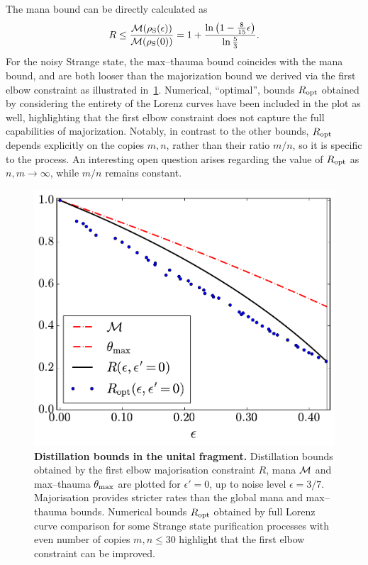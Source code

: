 \documentclass[pra,
aps,
twocolumn,
superscriptaddress,
groupedaddress,
nofootinbib,
reprint
]{revtex4-1}
\begin{document}
The mana bound can be directly calculated as
\begin{equation}
	R \leq \frac{{{\mathcal M}(\rho_{\rm{S}}(\epsilon))}}{{{\mathcal M}(\rho_{\rm{S}}(0))}} = 1 + \frac{\ln \left(1 - \frac{8}{15}\epsilon \right)}{\ln \frac{5}{3}}.
\end{equation}
For the noisy Strange state, the max--thauma bound coincides with the mana bound, and are both looser than the majorization bound we derived via the first elbow constraint as illustrated in~\cref{fig:distill_bounds}. 
Numerical, ``optimal'', bounds $R_{\rm{opt}}$ obtained by considering the entirety of the Lorenz curves have been included in the plot as well, highlighting that the first elbow constraint does not capture the full capabilities of majorization.
Notably, in contrast to the other bounds, $R_{\rm{opt}}$ depends explicitly on the copies $m,n$, rather than their ratio $m/n$, so it is specific to the process.
An interesting open question arises regarding the value of $R_{\rm{opt}}$ as $n,m \rightarrow \infty$, while $m/n$ remains constant.
\begin{figure}[t]
    \centering
    \includegraphics[scale=0.45]{figs/distill_bounds.pdf}
    \caption{\textbf{Distillation bounds in the unital fragment.} Distillation bounds obtained by the first elbow majorisation constraint $R$, mana ${\mathcal M}$ and max--thauma $\theta_{\rm{max}}$ are plotted for $\epsilon' = 0$, up to noise level $\epsilon = 3/7$.
    Majorisation provides stricter rates than the global mana and max--thauma bounds.
    Numerical bounds $R_{\rm{opt}}$ obtained by full Lorenz curve comparison for some Strange state purification processes with even number of copies $m,n \leq 30$ highlight that the first elbow constraint can be improved.
    }
    \label{fig:distill_bounds}
\end{figure}
\end{document}
